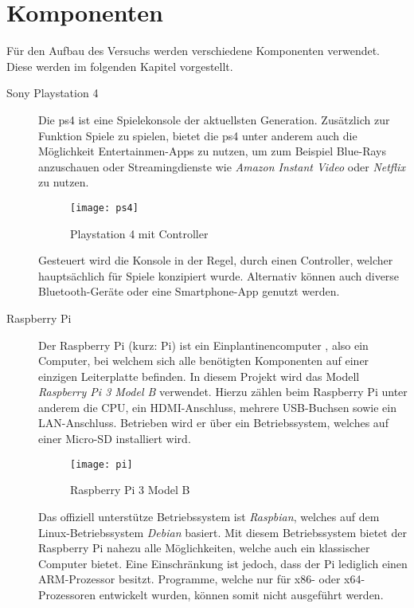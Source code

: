 \section{Komponenten}\label{sec:komponenten}
Für den Aufbau des Versuchs werden verschiedene Komponenten verwendet.
Diese werden im folgenden Kapitel vorgestellt.

\begin{description}
    \item[Sony Playstation 4 \cite{PS4Welco38:online}]
        Die \ac{ps4} ist eine Spielekonsole der aktuellsten Generation.
        Zusätzlich zur Funktion Spiele zu spielen, bietet die \ac{ps4}
        unter anderem auch die Möglichkeit Entertainmen-Apps zu nutzen, um zum Beispiel Blue-Rays anzuschauen
        oder Streamingdienste wie \textit{Amazon Instant Video} oder \textit{Netflix} zu nutzen.

        \begin{figure}[h!]
            \centering
            \texttt{[image: ps4]}
            \caption{Playstation 4 mit Controller}\label{fig:ps4}
        \end{figure}

        Gesteuert wird die Konsole in der Regel, durch einen Controller, welcher hauptsächlich für Spiele konzipiert wurde.
        Alternativ können auch diverse Bluetooth-Geräte oder eine Smartphone-App genutzt werden.

    \item[Raspberry Pi \cite{Whatisth47:online}]
        Der Raspberry Pi (kurz: Pi) ist ein Einplantinencomputer \cite{Einplati37:online}, also ein Computer,
        bei welchem sich alle benötigten Komponenten auf einer einzigen Leiterplatte befinden.
        In diesem Projekt wird das Modell \textit{Raspberry Pi 3 Model B} verwendet.
        Hierzu zählen beim Raspberry Pi unter anderem die CPU, ein HDMI-Anschluss, mehrere USB-Buchsen sowie ein LAN-Anschluss.
        Betrieben wird er über ein Betriebssystem, welches auf einer Micro-SD installiert wird.

        \begin{figure}[h!]
            \centering
            \texttt{[image: pi]}
            \caption{Raspberry Pi 3 Model B \cite{Raspberr2:online}}\label{fig:pi}
        \end{figure}

        Das offiziell unterstütze Betriebssystem ist \textit{Raspbian}, welches auf dem Linux-Betriebssystem \textit{Debian} basiert.
        Mit diesem Betriebssystem bietet der Raspberry Pi nahezu alle Möglichkeiten, welche auch ein klassischer Computer bietet.
        Eine Einschränkung ist jedoch, dass der Pi lediglich einen ARM-Prozessor besitzt.
        Programme, welche nur für x86- oder x64-Prozessoren entwickelt wurden, können somit nicht ausgeführt werden.


\end{description}
